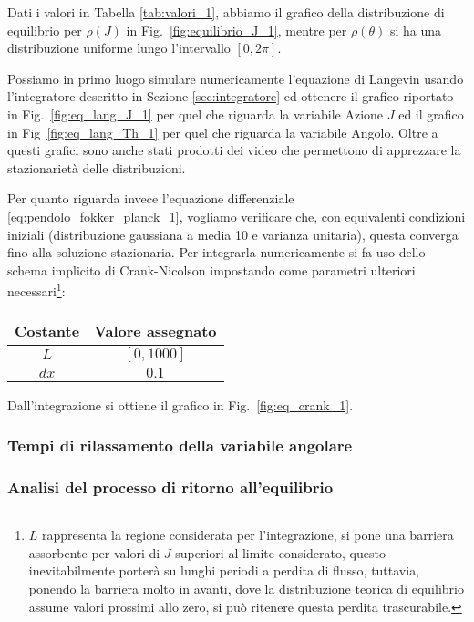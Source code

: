 \documentclass[10pt,a4paper]{article}
\begin{document}
Dati i valori in Tabella \ref{tab:valori_1}, abbiamo il grafico della distribuzione di equilibrio per \(\rho(J)\) in Fig.~\ref{fig:equilibrio_J_1}, mentre per \(\rho(\theta)\) si ha una distribuzione uniforme lungo l'intervallo \([0,2\pi]\).

Possiamo in primo luogo simulare numericamente l'equazione di Langevin usando l'integratore descritto in Sezione \ref{sec:integratore} ed ottenere il grafico riportato in Fig.~\ref{fig:eq_lang_J_1} per quel che riguarda la variabile Azione \(J\) ed il grafico in Fig~\ref{fig:eq_lang_Th_1} per quel che riguarda la variabile Angolo. Oltre a questi grafici sono anche stati prodotti dei video che permettono di apprezzare la stazionarietà delle distribuzioni.

Per quanto riguarda invece l'equazione differenziale \eqref{eq:pendolo_fokker_planck_1}, vogliamo verificare che, con equivalenti condizioni iniziali (distribuzione gaussiana a media 10 e varianza unitaria), questa converga fino alla soluzione stazionaria. Per integrarla numericamente si fa uso dello schema implicito di Crank-Nicolson impostando come parametri ulteriori necessari\footnote{\(L\) rappresenta la regione considerata per l'integrazione, si pone una barriera assorbente per valori di \(J\) superiori al limite considerato, questo inevitabilmente porterà su lunghi periodi a perdita di flusso, tuttavia, ponendo la barriera molto in avanti, dove la distribuzione teorica di equilibrio assume valori prossimi allo zero, si può ritenere questa perdita trascurabile.}:
\begin{center}
	\begin{tabular}{cc}
	\toprule
	Costante & {Valore assegnato} \\
	\midrule
	\(L\)		& \([0,1000]\)	\\
	\(dx\)		& \(0.1\)	\\
	\bottomrule
	\end{tabular}
	\label{tab:valori_2}
\end{center}
Dall'integrazione si ottiene il grafico in Fig.~\ref{fig:eq_crank_1}.



\subsubsection{Tempi di rilassamento della variabile angolare}

\subsubsection{Analisi del processo di ritorno all'equilibrio}
\end{document}
